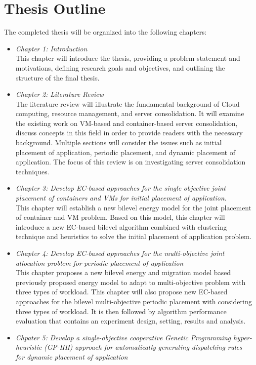 \section{Thesis Outline}
The completed thesis will be organized into the following chapters:
\begin{itemize}
	\item \textit{Chapter 1: Introduction} \\
	This chapter will introduce the thesis, providing a problem statement and motivations, defining research goals and objectives, and outlining the structure of the final thesis.
	\item \textit{Chapter 2: Literature Review} \\
	The literature review will illustrate the fundamental background of Cloud computing, resource management, and server consolidation. It will examine the existing work on VM-based and container-based server consolidation, discuss concepts in this field in order to provide readers with the necessary background. Multiple sections will consider the issues such as initial placement of application, periodic placement, and dynamic placement of application. The focus of this review is on investigating server consolidation techniques.
	\item \textit{Chapter 3: Develop EC-based approaches for the single objective joint placement of containers and VMs for initial placement of application.} \\
	This chapter will establish a new bilevel energy model for the joint placement of container and VM problem. Based on this model, this chapter will introduce a new EC-based bilevel algorithm combined with clustering technique and heuristics to solve the initial placement of application problem. 
	\item \textit{Chapter 4: Develop EC-based approaches for the multi-objective joint allocation problem for periodic placement of application} \\
	This chapter proposes a new bilevel energy and migration model based previously proposed energy model to adapt to multi-objective problem with three types of workload.  This chapter will also propose new EC-based approaches for the bilevel multi-objective periodic placement with considering three types of workload. It is then followed by algorithm performance evaluation that contains an experiment design, setting, results and analysis.
	\item \textit{Chpater 5: Develop a  single-objective cooperative Genetic Programming hyper-heuristic (GP-HH) approach for automatically generating dispatching rules for dynamic placement of application} \\

\end{itemize}
